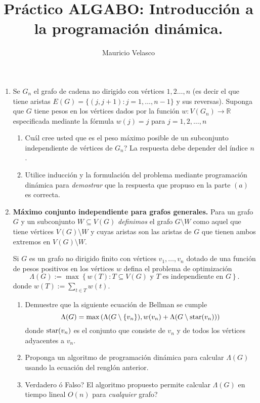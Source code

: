 \documentclass[12pt, a4paper]{article}
\date{}
\begin{document}
\title{Pr\'actico ALGABO: Introducción a la programaci\'on dinámica.}
\author{Mauricio Velasco}
\maketitle{}
\begin{enumerate} 



\item Se $G_n$ el grafo de cadena no dirigido con v\'ertices $1,2\dots, n$ (es decir el que tiene aristas $E(G)=\{(j,j+1): j=1,\dots,n-1 \}$ y sus reversas). Suponga que $G$ tiene pesos en los v\'ertices dados por la funci\'on $w: V(G_n)\rightarrow \mathbb{R}$ especificada mediante la fórmula $w(j)=j$ para $j=1,2,\dots, n$ 
\begin{enumerate}
\item Cuál cree usted que es el peso m\'aximo  posible de un subconjunto independiente de vértices de $G_n$? La respuesta debe depender del \'indice $n$.
\item Utilice inducción y la formulaci\'on del problema mediante programaci\'on din\'amica para {\it demostrar} que la respuesta que propuso en la parte $(a)$ es correcta.
\end{enumerate}

\item {\bf M\'aximo conjunto independiente para grafos generales.}  Para un grafo $G$ y un subconjunto $W\subseteq V(G)$ {\it definimos} el grafo $G\setminus W$ como aquel que tiene v\'ertices $V(G)\setminus W$ y cuyas aristas son las aristas de $G$ que tienen ambos extremos en $V(G)\setminus W$.

Si $G$ es un grafo no dirigido finito con v\'ertices $v_1,\dots , v_n$ dotado de una funci\'on de pesos positivos en los v\'ertices $w$ defina el problema de optimización 
\[\Lambda(G):=\max\left\{ w(T): T\subseteq V(G)\text{ y $T$ es independiente en $G$}\right\}.\] 
donde $w(T):=\sum_{t\in T} w(t)$. 

\begin{enumerate}
\item  Demuestre que la siguiente ecuaci\'on de Bellman se cumple 
\[\Lambda(G) = \max\left( \Lambda(G\setminus\{v_n\}), w(v_n) + \Lambda(G\setminus {\rm star}(v_n))\right)\]
donde ${\rm star}(v_n)$ es el conjunto que consiste de $v_n$ y de todos los v\'ertices adyacentes a $v_n$.
\item Proponga un algoritmo de programaci\'on din\'amica para calcular $\Lambda(G)$ usando la ecuaci\'on del rengl\'on anterior.
\item Verdadero \'o Falso? El algoritmo propuesto permite calcular $\Lambda(G)$ en tiempo lineal $O(n)$ para {\it cualquier} grafo?
\end{enumerate}


\end{enumerate}
\end{document}
